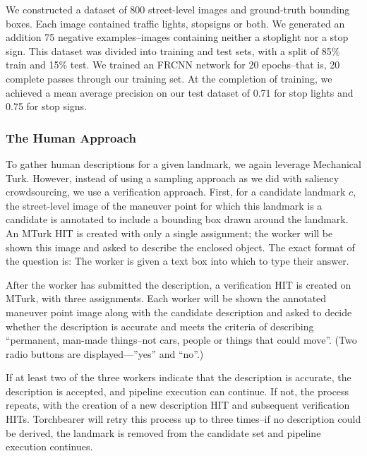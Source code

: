 We constructed a dataset of 800 street-level images and ground-truth bounding boxes. Each image contained traffic lights, stopsigns or both. We generated an addition 75 negative examples--images containing neither a stoplight nor a stop sign. This dataset was divided into training and test sets, with a split of 85\% train and 15\% test. We trained an FRCNN network for 20 epochs--that is, 20 complete passes through our training set. At the completion of training, we achieved a mean average precision on our test dataset of 0.71 for stop lights and 0.75 for stop signs.
	
\subsubsection{The Human Approach}
To gather human descriptions for a given landmark, we again leverage Mechanical Turk. However, instead of using a sampling approach as we did with saliency crowdsourcing, we use a verification approach.
First, for a candidate landmark $c$, the street-level image of the maneuver point for which this landmark is a candidate is annotated to include a bounding box drawn around the landmark. An MTurk HIT is created with only a single assignment; the worker will be shown this image and asked to describe the enclosed object. The exact format of the question is:  The worker is given a text box into which to type their answer.

After the worker has submitted the description, a verification HIT is created on MTurk, with three assignments. Each worker will be shown the annotated maneuver point image along with the candidate description and asked to decide whether the description is accurate and meets the criteria of describing “permanent, man-made things--not cars, people or things that could move”. (Two radio buttons are displayed—”yes” and “no”.)

 If at least two of the three workers indicate that the description is accurate, the description is accepted, and pipeline execution can continue. If not, the process repeats, with the creation of a new description HIT and subsequent verification HITs. Torchbearer will retry this process up to three times--if no description could be derived, the landmark is removed from the candidate set and pipeline execution continues.

